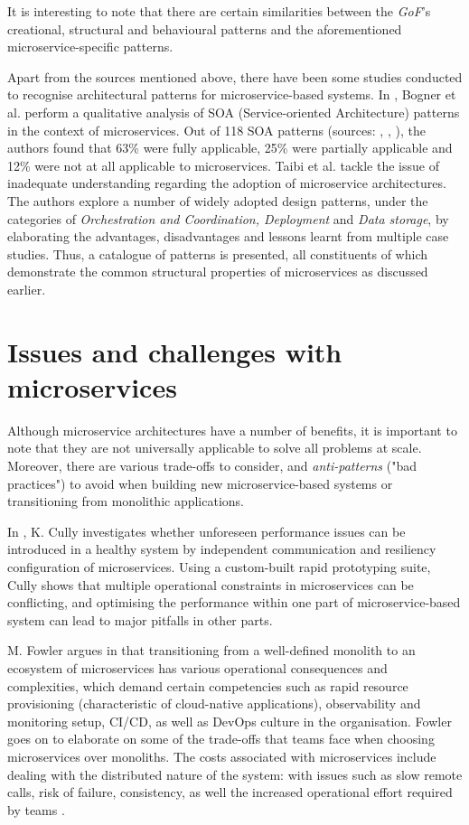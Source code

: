 It is interesting to note that there are certain similarities between the \textit{GoF}'s creational, structural and behavioural patterns \cite{gof94} and the aforementioned microservice-specific patterns. \linebreak

Apart from the sources mentioned above, there have been some studies conducted to recognise architectural patterns for microservice-based systems. In \cite{bogner18}, Bogner et al. perform a qualitative analysis of SOA (Service-oriented Architecture) patterns in the context of microservices. Out of 118 SOA patterns (sources: \cite{erl09}, \cite{erl12}, \cite{rotem12}), the authors found that 63\% were fully applicable, 25\% were partially applicable and 12\% were not at all applicable to microservices. Taibi et al. \cite{taibi18} tackle the issue of inadequate understanding regarding the adoption of microservice architectures. The authors explore a number of widely adopted design patterns, under the categories of \textit{Orchestration and Coordination, Deployment} and \textit{Data storage}, by elaborating the advantages, disadvantages and lessons learnt from multiple case studies. Thus, a catalogue of patterns is presented, all constituents of which demonstrate the common structural properties of microservices as discussed earlier.

\section{Issues and challenges with microservices}

Although microservice architectures have a number of benefits, it is important to note that they are not universally applicable to solve all problems at scale. Moreover, there are various trade-offs to consider, and \textit{anti-patterns} ("bad practices") to avoid when building new microservice-based systems or transitioning from monolithic applications.

In \cite{cully20}, K. Cully investigates whether unforeseen performance issues can be introduced in a healthy system by independent communication and resiliency configuration of microservices. Using a custom-built rapid prototyping suite, Cully shows that multiple operational constraints in microservices can be conflicting, and optimising the performance within one part of microservice-based system can lead to major pitfalls in other parts.

M. Fowler argues in \cite{fowler14} that transitioning from a well-defined monolith to an ecosystem of microservices has various operational consequences and complexities, which demand certain competencies such as rapid resource provisioning (characteristic of cloud-native applications), observability and monitoring setup, CI/CD, as well as DevOps culture in the organisation. Fowler goes on to elaborate on some of the trade-offs that teams face when choosing microservices over monoliths. The costs associated with microservices include dealing with the distributed nature of the system: with issues such as slow remote calls, risk of failure, consistency, as well the increased operational effort required by teams \cite{fowler15}.

